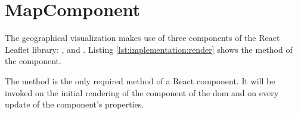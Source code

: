 





\section{MapComponent}

The geographical visualization makes use of three components of the React Leaflet library:
,  and .
Listing \ref{lst:implementation:render} shows the  method of the component.



The  method is the only required method of a React component.
It will be invoked on the initial rendering of the component of the \gls{dom} and on every update of the component's properties.

